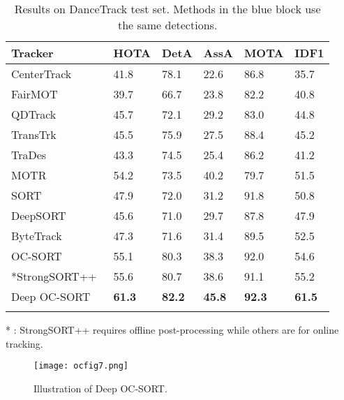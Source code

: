 \documentclass{article}
\newcommand*{\belowrulesepcolor}[1]{\noalign{\kern-\belowrulesep 
    \begingroup 
      \color{#1}\hrule height\belowrulesep 
    \endgroup 
  }}
\newcommand*{\aboverulesepcolor}[1]{\noalign{\begingroup 
      \color{#1}\hrule height\aboverulesep 
    \endgroup 
    \kern-\aboverulesep 
  }}
\begin{document}
\begin{table}[hbt!]
\centering
\caption{Results on DanceTrack test set. Methods in the blue block use the same detections.}
\setlength{\tabcolsep}{7pt}
\scriptsize
\begin{tabular}{ l | p{2.2em}p{2em}p{2em}p{2.3em}p{2.3em}}
\toprule
Tracker & HOTA & DetA & AssA & MOTA & IDF1\\
\midrule
CenterTrack~\cite{centertrack} & 41.8 & 78.1 & 22.6 & 86.8 & 35.7 \\
FairMOT~\cite{zhang2021fairmot} & 39.7 & 66.7 & 23.8 & 82.2 & 40.8\\
QDTrack~\cite{pang2021quasi} & 45.7 & 72.1 & 29.2 & 83.0 & 44.8\\
TransTrk\cite{sun2020transtrack} & 45.5 & 75.9 & 27.5 & 88.4 & 45.2\\
TraDes~\cite{trades} & 43.3 & 74.5 & 25.4 & 86.2 & 41.2 \\ 
MOTR~\cite{zeng2021motr} & 54.2 & 73.5 & 40.2 & 79.7 & 51.5\\
\midrule
\belowrulesepcolor{babyblue!20} 
\rowcolor{babyblue!20} SORT~\cite{bewley2016simple} & 47.9 & 72.0 & 31.2 & 91.8 & 50.8 \\
\aboverulesepcolor{babyblue!20} 
\rowcolor{babyblue!20}DeepSORT~\cite{deepsort} & 45.6 & 71.0 & 29.7 & 87.8 & 47.9\\
\rowcolor{babyblue!20}ByteTrack~\cite{bytetrack} & 47.3 & 71.6 & 31.4 & 89.5 & 52.5\\
\rowcolor{babyblue!20}OC-SORT~\cite{cao2022observation} & 55.1 & 80.3 & 38.3 & 92.0 & 54.6\\
\rowcolor{babyblue!20}*StrongSORT++~\cite{strongsort} & 55.6 & 80.7 & 38.6 & 91.1 & 55.2\\
\rowcolor{babyblue!20}Deep OC-SORT & \textbf{61.3} & \textbf{82.2} & \textbf{45.8} & \textbf{92.3} & \textbf{61.5}\\
\aboverulesepcolor{babyblue!20} 
\bottomrule
\end{tabular}
\begin{center}\scriptsize
\vspace{-0.4cm}
\item[*]: StrongSORT++ requires offline post-processing while others are for online tracking.
\end{center}
\label{table:dancetrack}
\vspace{-0.5cm}
\end{table}

\begin{figure}[h!]
    \centering
    \texttt{[image: ocfig7.png]}
    \caption{Illustration of Deep OC-SORT.}
    \label{fig:cloth_characteristic2}
\end{figure}
\vspace{-2em}
\end{document}
